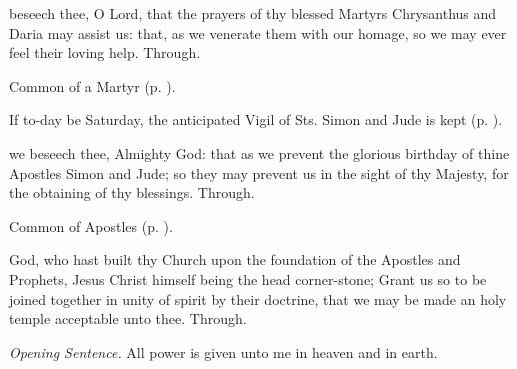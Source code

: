 \memorialCollect
{} beseech thee, O Lord, that the prayers of thy blessed Martyrs Chrysanthus and Daria may assist us: that, as we venerate them with our homage, so we may ever feel their loving help. Through.


\clearpage
{}

\begin{rubric}
	Common of a Martyr (p. \pageref{CommonMartyrBishopCollect}).
\end{rubric}

\begin{rubric}
	If to-day be Saturday, the anticipated Vigil of Sts. Simon and Jude is kept (p. \pageref{SimonJudeVigil}).
\end{rubric}


\vspace{-0.5\baselineskip}

\label{SimonJudeVigil}

{} we beseech thee, Almighty God: that as we prevent the glorious birthday of thine Apostles Simon and Jude; so they may prevent us in the sight of thy Majesty, for the obtaining of thy blessings. Through.



\begin{rubric}
	Common of Apostles (p. \pageref{CommonApostles}).
\end{rubric}

{} God, who hast built thy Church upon the foundation of the Apostles and Prophets, Jesus Christ himself being the head corner-stone; Grant us so to be joined together in unity of spirit by their doctrine, that we may be made an holy temple acceptable unto thee. Through.


\fancyhead[RE,LO]{}

\par\noindent
\textit{Opening Sentence.} All power is given unto me in heaven and in earth.

